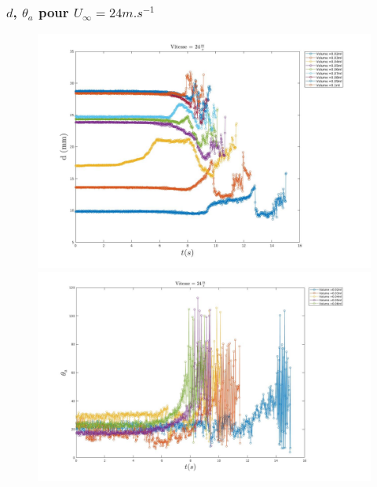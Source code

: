 \documentclass{beamer}
\begin{document}
\begin{frame}
	\frametitle{$d$, $\theta_{a}$ pour $U_{\infty}=24m.s^{-1}$}
\begin{figure}[!ht]
	\centering
	\begin{minipage}{0.5\linewidth}
		\includegraphics[width = \linewidth]{./image/v=24d.jpg}
	\end{minipage}
	\vfill
	\begin{minipage}{0.5\linewidth}
	\includegraphics[width = \linewidth]{./image/v=24oa_2.jpg}
	\end{minipage}
\end{figure}
\end{frame}
\end{document}
